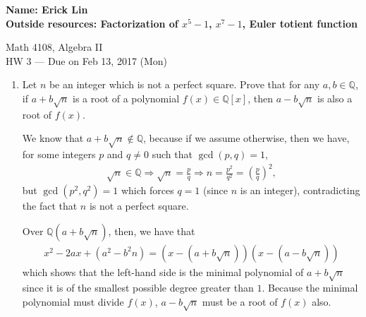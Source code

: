 \documentclass[12pt]{article}
\newcommand{\QQ}{\mathbb{Q}}
\begin{document}
\noindent
\textbf{Name: Erick Lin} \smallskip  \\
\textbf{Outside resources: Factorization of $x^5 - 1$, $x^7 - 1$, Euler totient function} %

\begin{center}
{
Math 4108, Algebra II \\
HW 3 --- Due on Feb 13, 2017 (Mon) 
}
\end{center}


\begin{enumerate}
    \item Let $n$ be an integer which is not a perfect square.  Prove that for any $a,b \in \QQ$, if $a + b \sqrt{n}$ is a root of a polynomial $f(x) \in \QQ[x]$, then $a - b \sqrt{n}$ is also a root of $f(x)$. \par
        We know that $a + b\sqrt{n} \notin \QQ$, because if we assume otherwise, then we have, for some integers $p$ and $q \neq 0$ such that $\gcd(p, q) = 1$,
        \begin{align*}
            \sqrt{n} \in \QQ \Rightarrow \sqrt{n} = \frac{p}{q} \Rightarrow n = \frac{p^2}{q^2} = \left( \frac{p}{q} \right)^2,
        \end{align*}
        but $\gcd(p^2, q^2) = 1$ which forces $q = 1$ (since $n$ is an integer), contradicting the fact that $n$ is not a perfect square. \par
        Over $\mathbb{Q}(a + b\sqrt{n})$, then, we have that
        \begin{align*}
            x^2 - 2ax + (a^2 - b^2 n) = (x - (a + b\sqrt{n}))(x - (a - b\sqrt{n}))
        \end{align*}
        which shows that the left-hand side is the minimal polynomial of $a + b\sqrt{n}$ since it is of the smallest possible degree greater than $1$. Because the minimal polynomial must divide $f(x)$, $a - b\sqrt{n}$ must be a root of $f(x)$ also.


\end{enumerate}
\end{document}
